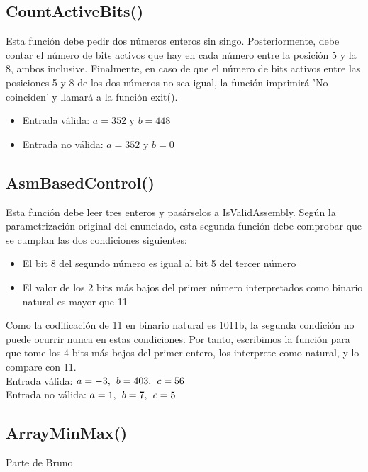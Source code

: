 \documentclass[11pt,a4paper]{article}
\begin{document}
\subsection{CountActiveBits()}
Esta función debe pedir dos números enteros sin singo. Posteriormente, debe contar el número de bits activos
que hay en cada número entre la posición 5 y la 8, ambos inclusive. Finalmente, en caso de que el 
número de bits activos entre las posiciones 5 y 8 de los dos números   no sea igual, la función 
imprimirá 'No coinciden' y llamará a la función exit().
\begin{itemize}
  \item Entrada válida: \(a = 352 \text{ y } b = 448\)
  \item Entrada no válida: \(a = 352 \text{ y } b = 0\)
\end{itemize}
\subsection{AsmBasedControl()}
\hspace{1mm}
Esta función debe leer tres enteros y pasárselos a IsValidAssembly.
Según la parametrización original del enunciado, esta segunda función debe comprobar que se
cumplan las dos condiciones siguientes:
\begin{itemize}
    \item El bit 8 del segundo número es igual al bit 5 del tercer número
    \item El valor de los 2 bits más bajos del primer número interpretados como 
        binario natural es mayor que 11
\end{itemize}
Como la codificación de 11 en binario natural es 1011b, la segunda condición no puede
ocurrir nunca en estas condiciones. Por tanto, escribimos la función para que tome los 4 bits
más bajos del primer entero, los interprete como natural, y lo compare con 11.
\\[3ex]
\noindent Entrada válida: $a = -3, \hspace{1.5mm} b = 403, \hspace{1.5mm} c = 56$ \\[2ex]
\noindent Entrada no válida: $a = 1, \hspace{1.5mm} b = 7, \hspace{1.5mm} c = 5$

\subsection{ArrayMinMax()}
Parte de Bruno
\end{document}
